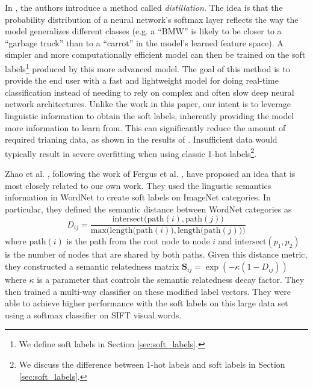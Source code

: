 In \cite{hinton2015distilling}, the authors introduce a method called
\emph{distillation}. The idea is that the probability distribution of a neural
network's softmax layer reflects the way the model generalizes different
classes (e.g. a ``BMW'' is likely to be closer to a ``garbage truck'' than to a
``carrot'' in the model's learned feature space). A simpler and more
computationally efficient model can then be trained on the
soft labels\footnote{
  We define soft labels in Section \ref{sec:soft_labels}.
} produced by this more advanced model.
The goal of this method is to provide the end user with a fast and lightweight
model for doing real-time classification instead of needing to rely on complex
and often slow deep neural network architectures.
Unlike the work in this paper, our intent is to leverage linguistic information
to obtain the soft labels, inherently providing the model more information to
learn from. This can significantly reduce the amount of required trianing data,
as shown in the results of \cite{hinton2015distilling}. Insufficient data would
typically result in severe overfitting when using classic
1-hot labels\footnote{
  We discuss the difference between 1-hot labels and soft labels in Section
  \ref{sec:soft_labels}.
}.


Zhao et al. \cite{zhao2011large}, following the work of Fergus et al.
\cite{fergus2010semantic}, have proposed an idea that is most closely related
to our own work.
They used the lingustic semantics information in WordNet to create soft labels
on ImageNet categories. In particular, they defined the semantic distance
between WordNet categories as
\begin{equation}
\label{eq:wordnet_dist}
D_{ij} = \frac{\mathrm{intersect(path}(i), \mathrm{path}(j))}{\mathrm{max(length(path}(i)), \mathrm{length(path}(j)))}
\end{equation}
where $\mathrm{path}(i)$ is the path from the root node to node $i$ and
$\mathrm{intersect}(p_1, p_2)$ is the number of nodes that are shared by both
paths. Given this distance metric, they constructed a semantic relatedness
matrix $\mathbf{S}_{ij} = \exp(-\kappa(1-D_{ij}))$ where $\kappa$ is a
parameter that controls the semantic relatedness decay factor.
They then trained a multi-way classifier on these modified label vectors. They
were able to achieve higher performance with the soft labels on this large data
set using a softmax classifier on SIFT visual words.


